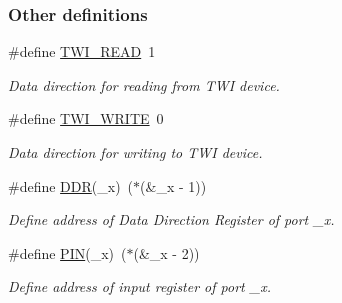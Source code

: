 \subsubsection*{Other definitions}
\begin{DoxyCompactItemize}
\item 
\#define \hyperlink{a00014_gaaf9a8abccd811954f9cc316f2b2f87b3}{T\+W\+I\+\_\+\+R\+E\+AD}~1\hypertarget{a00014_gaaf9a8abccd811954f9cc316f2b2f87b3}{}\label{a00014_gaaf9a8abccd811954f9cc316f2b2f87b3}

\begin{DoxyCompactList}\small\item\em Data direction for reading from T\+WI device. \end{DoxyCompactList}\item 
\#define \hyperlink{a00014_ga3b68e8e777b71520f9dbfac733774d5f}{T\+W\+I\+\_\+\+W\+R\+I\+TE}~0\hypertarget{a00014_ga3b68e8e777b71520f9dbfac733774d5f}{}\label{a00014_ga3b68e8e777b71520f9dbfac733774d5f}

\begin{DoxyCompactList}\small\item\em Data direction for writing to T\+WI device. \end{DoxyCompactList}\item 
\#define \hyperlink{a00014_ga6c0346728feb274834cad94daca316ee}{D\+DR}(\+\_\+x)~($\ast$(\&\+\_\+x -\/ 1))\hypertarget{a00014_ga6c0346728feb274834cad94daca316ee}{}\label{a00014_ga6c0346728feb274834cad94daca316ee}

\begin{DoxyCompactList}\small\item\em Define address of Data Direction Register of port \+\_\+x. \end{DoxyCompactList}\item 
\#define \hyperlink{a00014_ga740f9eb9c9f9e33500ee61ec53945f6a}{P\+IN}(\+\_\+x)~($\ast$(\&\+\_\+x -\/ 2))\hypertarget{a00014_ga740f9eb9c9f9e33500ee61ec53945f6a}{}\label{a00014_ga740f9eb9c9f9e33500ee61ec53945f6a}

\begin{DoxyCompactList}\small\item\em Define address of input register of port \+\_\+x. \end{DoxyCompactList}\end{DoxyCompactItemize}

